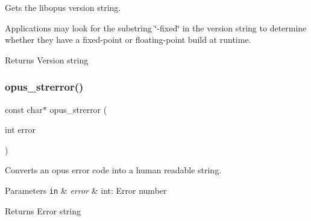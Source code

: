 Gets the libopus version string. 

Applications may look for the substring \char`\"{}-\/fixed\char`\"{} in the version string to determine whether they have a fixed-\/point or floating-\/point build at runtime.

\begin{DoxyReturn}{Returns}
Version string 
\end{DoxyReturn}
\mbox{\label{group__opus__libinfo_gafad3bac5a05dc7c3477a5765eb5e1873}} 
\subsubsection{\texorpdfstring{opus\+\_\+strerror()}{opus\_strerror()}}
{\footnotesize\ttfamily const char$\ast$ opus\+\_\+strerror (\begin{DoxyParamCaption}\item[{int}]{error }\end{DoxyParamCaption})}



Converts an opus error code into a human readable string. 


\begin{DoxyParams}[1]{Parameters}
\mbox{\tt in}  & {\em error} & {\ttfamily int}\+: Error number \\
\hline
\end{DoxyParams}
\begin{DoxyReturn}{Returns}
Error string 
\end{DoxyReturn}

